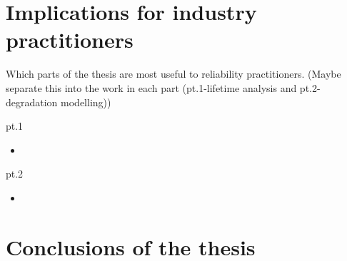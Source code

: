 \section{Implications for industry practitioners}

Which parts of the thesis are most useful to reliability practitioners. (Maybe separate this into the work in each part (pt.1-lifetime analysis and pt.2-degradation modelling))

pt.1
\begin{itemize}
  \item 
\end{itemize}

pt.2
\begin{itemize}
  \item 
\end{itemize}

\section{Conclusions of the thesis}